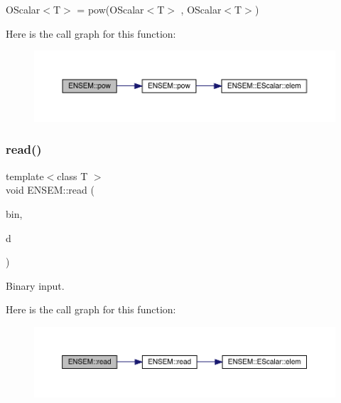 O\+Scalar$<$\+T$>$ = pow(\+O\+Scalar$<$\+T$>$ , O\+Scalar$<$\+T$>$) 

Here is the call graph for this function\+:\nopagebreak
\begin{figure}[H]
\begin{center}
\leavevmode
\includegraphics[width=350pt]{d1/d71/group__obsscalar_ga9cb05cc2982ed462255669689f38c8cd_cgraph}
\end{center}
\end{figure}
\mbox{\label{group__obsscalar_ga5b22786975bbf72d834fd044913a417b}} 
\subsubsection{\texorpdfstring{read()}{read()}\hspace{0.1cm}{\footnotesize\ttfamily [1/2]}}
{\footnotesize\ttfamily template$<$class T $>$ \\
void E\+N\+S\+E\+M\+::read (\begin{DoxyParamCaption}\item[{\mbox{\hyperlink{classADATIO_1_1BinaryReader}{A\+D\+A\+T\+I\+O\+::\+Binary\+Reader}} \&}]{bin,  }\item[{\mbox{\hyperlink{classENSEM_1_1OScalar}{O\+Scalar}}$<$ T $>$ \&}]{d }\end{DoxyParamCaption})\hspace{0.3cm}{\ttfamily [inline]}}



Binary input. 

Here is the call graph for this function\+:\nopagebreak
\begin{figure}[H]
\begin{center}
\leavevmode
\includegraphics[width=350pt]{d1/d71/group__obsscalar_ga5b22786975bbf72d834fd044913a417b_cgraph}
\end{center}
\end{figure}
\mbox{\label{group__obsscalar_ga8844f89649f50b51ab6ae9f43064458c}} 
